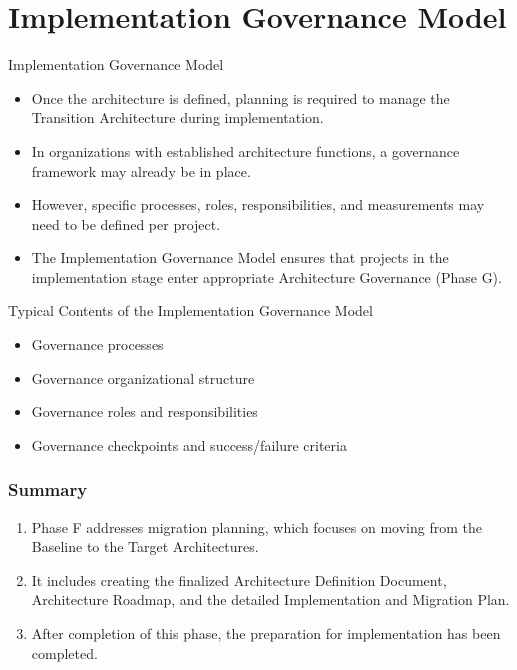 \documentclass[aspectratio=169, table]{beamer}
\begin{document}
\section{Implementation Governance Model}

\begin{frame}{Implementation Governance Model}
	\begin{itemize}
		\item Once the architecture is defined, planning is required to manage the Transition Architecture during implementation.
		\item In organizations with established architecture functions, a governance framework may already be in place.
		\item However, specific processes, roles, responsibilities, and measurements may need to be defined per project.
		\item The Implementation Governance Model ensures that projects in the implementation stage enter appropriate Architecture Governance (Phase G).
	\end{itemize}
\end{frame}

\begin{frame}{\Large{Typical Contents of the Implementation Governance Model}}
	\begin{itemize}
		\item Governance processes
		\item Governance organizational structure
		\item Governance roles and responsibilities
		\item Governance checkpoints and success/failure criteria
	\end{itemize}
\end{frame}

	\begin{frame}
		\frametitle{Summary}
		\begin{enumerate}
			\item Phase F addresses migration planning, which focuses on moving from the Baseline to the Target Architectures.
			\item It includes creating the finalized Architecture Definition Document, Architecture Roadmap, and the detailed Implementation and Migration Plan.
			\item After completion of this phase, the preparation for implementation has been completed.
		\end{enumerate}
	\end{frame}
\end{document}

